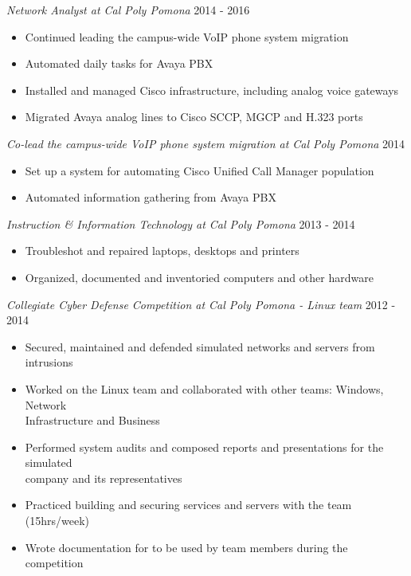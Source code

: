\documentclass[line]{docs/resume/res}
\begin{document}
\begin{resume}
  {\sl Network Analyst at Cal Poly Pomona} \hfill 2014 - 2016
  \begin{itemize} \itemsep -2pt
    \item Continued leading the campus-wide VoIP phone system migration
    \item Automated daily tasks for Avaya PBX
    \item Installed and managed Cisco infrastructure, including analog voice gateways
    \item Migrated Avaya analog lines to Cisco SCCP, MGCP and H.323 ports
  \end{itemize}

  {\sl Co-lead the campus-wide VoIP phone system migration at Cal Poly Pomona} \hfill 2014
  \begin{itemize} \itemsep -2pt
    \item Set up a system for automating Cisco Unified Call Manager population
    \item Automated information gathering from Avaya PBX
  \end{itemize}

  {\sl Instruction \& Information Technology at Cal Poly Pomona} \hfill 2013 - 2014
  \begin{itemize} \itemsep -2pt
    \item Troubleshot and repaired laptops, desktops and printers
    \item Organized, documented and inventoried computers and other hardware
  \end{itemize}

  {\sl Collegiate Cyber Defense Competition at Cal Poly Pomona - Linux team} \hfill 2012 - 2014
  \begin{itemize} \itemsep -2pt
    \item Secured, maintained and defended simulated networks and servers from intrusions
    \item Worked on the Linux team and collaborated with other teams: Windows, Network \\
      Infrastructure and Business
    \item Performed system audits and composed reports and presentations for the simulated \\
      company and its representatives
    \item Practiced building and securing services and servers with the team (15hrs/week)
    \item Wrote documentation for to be used by team members during the competition
  \end{itemize}


\end{resume}
\end{document}
